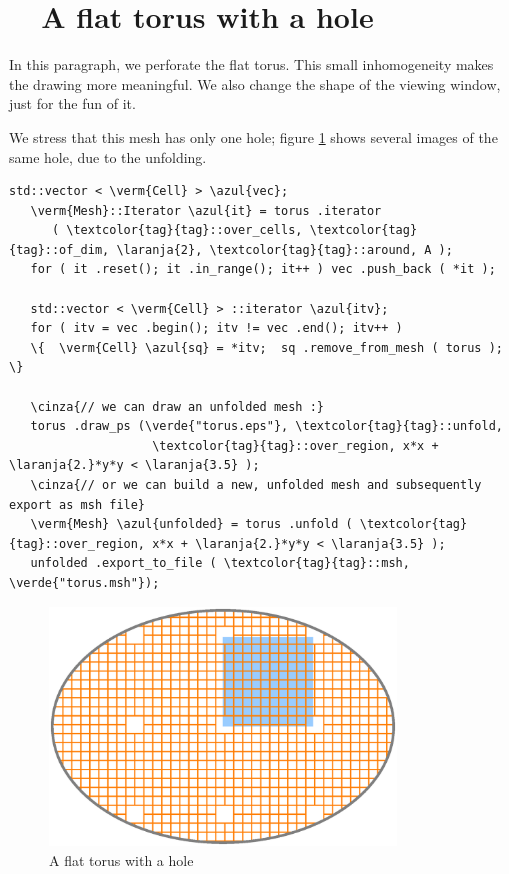 \section{~~A flat torus with a hole}\label{\numb section 7.\numb parag 6}

In this paragraph, we perforate the flat torus.
This small inhomogeneity makes the drawing more meaningful.
We also change the shape of the viewing window, just for the fun of it.

We stress that this mesh has only one hole; figure \ref{\numb section 7.\numb fig 2}
shows several images of the same hole, due to the unfolding.

\begin{Verbatim}[commandchars=\\\{\},formatcom=\small\tt,frame=single,
   label=parag-\ref{\numb section 7.\numb parag 6}.cpp,rulecolor=\color{moldura},
   baselinestretch=0.94,framesep=2mm                                            ]
   std::vector < \verm{Cell} > \azul{vec};
   \verm{Mesh}::Iterator \azul{it} = torus .iterator
      ( \textcolor{tag}{tag}::over_cells, \textcolor{tag}{tag}::of_dim, \laranja{2}, \textcolor{tag}{tag}::around, A );
   for ( it .reset(); it .in_range(); it++ ) vec .push_back ( *it );

   std::vector < \verm{Cell} > ::iterator \azul{itv};
   for ( itv = vec .begin(); itv != vec .end(); itv++ )
   \{  \verm{Cell} \azul{sq} = *itv;  sq .remove_from_mesh ( torus );  \}

   \cinza{// we can draw an unfolded mesh :}
   torus .draw_ps (\verde{"torus.eps"}, \textcolor{tag}{tag}::unfold,
                    \textcolor{tag}{tag}::over_region, x*x + \laranja{2.}*y*y < \laranja{3.5} );
   \cinza{// or we can build a new, unfolded mesh and subsequently export as msh file}
   \verm{Mesh} \azul{unfolded} = torus .unfold ( \textcolor{tag}{tag}::over_region, x*x + \laranja{2.}*y*y < \laranja{3.5} );
   unfolded .export_to_file ( \textcolor{tag}{tag}::msh, \verde{"torus.msh"});
\end{Verbatim}

\begin{figure}[ht] \centering
  \includegraphics[width=92mm]{flat-torus-2.eps}
  \caption{A flat torus with a hole}
  \label{\numb section 7.\numb fig 2}
\end{figure}

